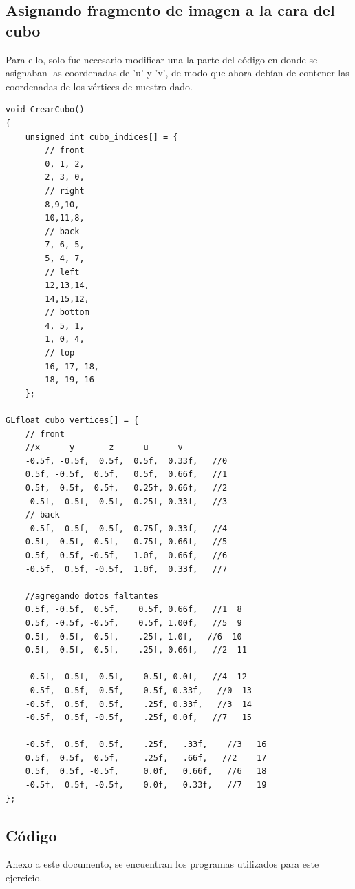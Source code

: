 \documentclass[12pt, a4paper]{article}
\begin{document}
\subsection{Asignando fragmento de imagen a la cara del cubo}
\vspace{.4cm}
\justify
Para ello, solo fue necesario modificar una la parte del código en donde se asignaban las coordenadas de 'u' y 'v', de modo que ahora debían de contener las coordenadas de los vértices de nuestro dado.\\[0.2cm]
\begin{verbatim}
void CrearCubo()
{
	unsigned int cubo_indices[] = {
		// front
		0, 1, 2,
		2, 3, 0,
		// right
		8,9,10,
		10,11,8,
		// back
		7, 6, 5,
		5, 4, 7,
		// left
		12,13,14,
		14,15,12,
		// bottom
		4, 5, 1,
		1, 0, 4,
		// top
		16, 17, 18,
		18, 19, 16
	};

GLfloat cubo_vertices[] = {
	// front
	//x      y       z      u	   v
	-0.5f, -0.5f,  0.5f,  0.5f,	 0.33f,   //0
	0.5f, -0.5f,  0.5f,   0.5f,	 0.66f,   //1
	0.5f,  0.5f,  0.5f,   0.25f, 0.66f,   //2
	-0.5f,  0.5f,  0.5f,  0.25f, 0.33f,   //3
	// back
	-0.5f, -0.5f, -0.5f,  0.75f, 0.33f,   //4
	0.5f, -0.5f, -0.5f,   0.75f, 0.66f,   //5
	0.5f,  0.5f, -0.5f,   1.0f,  0.66f,   //6
	-0.5f,  0.5f, -0.5f,  1.0f,  0.33f,   //7

	//agregando dotos faltantes 
	0.5f, -0.5f,  0.5f,    0.5f, 0.66f,   //1  8
	0.5f, -0.5f, -0.5f,    0.5f, 1.00f,   //5  9 
	0.5f,  0.5f, -0.5f,    .25f, 1.0f,   //6  10
	0.5f,  0.5f,  0.5f,    .25f, 0.66f,   //2  11

	-0.5f, -0.5f, -0.5f,    0.5f, 0.0f,   //4  12
	-0.5f, -0.5f,  0.5f,    0.5f, 0.33f,   //0  13
	-0.5f,  0.5f,  0.5f,    .25f, 0.33f,   //3  14
	-0.5f,  0.5f, -0.5f,    .25f, 0.0f,   //7   15

	-0.5f,  0.5f,  0.5f,    .25f,	.33f,    //3   16
	0.5f,  0.5f,  0.5f,     .25f,	.66f,   //2	   17	
	0.5f,  0.5f, -0.5f,     0.0f,	0.66f,   //6   18
	-0.5f,  0.5f, -0.5f,    0.0f,	0.33f,   //7   19
};
\end{verbatim}

\vspace{.5cm}
\subsection{Código}
Anexo a este documento, se encuentran los programas utilizados para este ejercicio.\\[.35cm]
	
\end{document}
